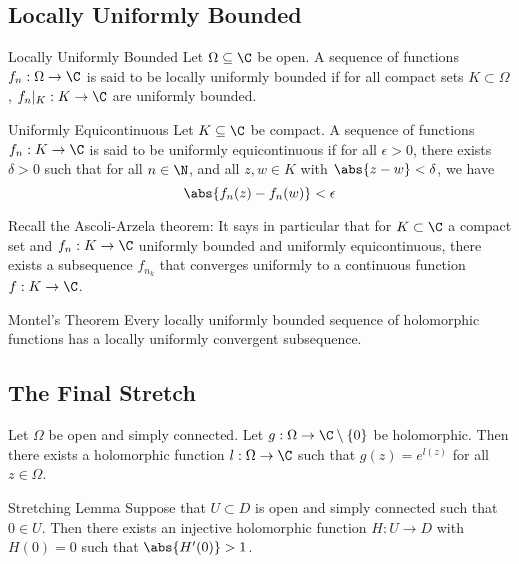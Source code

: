 \documentclass[a4paper]{article}
\begin{document}
\subsection{Locally Uniformly Bounded}
\begin{defn}{Locally Uniformly Bounded}{} Let $\Omega\subseteq\C$ be open. A sequence of functions $f_n:\Omega\to\C$ is said to be locally uniformly bounded if for all compact sets $K\subset\Omega$, $f_n|_K:K\to\C$ are uniformly bounded. 
\end{defn}

\begin{defn}{Uniformly Equicontinuous}{} Let $K\subseteq\C$ be compact. A sequence of functions $f_n:K\to\C$ is said to be uniformly equicontinuous if for all $\epsilon>0$, there exists $\delta>0$ such that for all $n\in\N$, and all $z,w\in K$ with $\abs{z-w}<\delta$, we have $$\abs{f_n(z)-f_n(w)}<\epsilon$$
\end{defn}

Recall the Ascoli-Arzela theorem: It says in particular that for $K\subset\C$ a compact set and $f_n:K\to\C$ uniformly bounded and uniformly equicontinuous, there exists a subsequence $f_{n_k}$ that converges uniformly to a continuous function $f:K\to\C$. 

\begin{thm}{Montel's Theorem}{} Every locally uniformly bounded sequence of holomorphic functions has a locally uniformly convergent subsequence. 
\end{thm}

\subsection{The Final Stretch}
\begin{lmm}{}{} Let $\Omega$ be open and simply connected. Let $g:\Omega\to\C\setminus\{0\}$ be holomorphic. Then there exists a holomorphic function $l:\Omega\to\C$ such that $g(z)=e^{l(z)}$ for all $z\in\Omega$. 
\end{lmm}

\begin{lmm}{Stretching Lemma}{} Suppose that $U\subset D$ is open and simply connected such that $0\in U$. Then there exists an injective holomorphic function $H:U\to D$ with $H(0)=0$ such that $\abs{H'(0)}>1$. 
\end{lmm}
\end{document}
